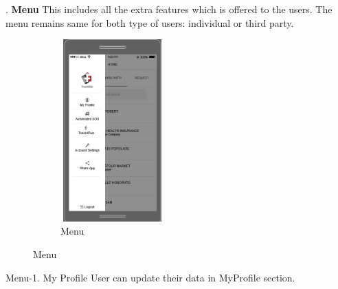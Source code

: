 .
\newline\newline\newline\newline\newline\newline\newline\newline
\textbf{Menu}
\newline
This includes all the extra features which is offered to the users. The menu remains same for both type of users: individual or third party.

\begin{figure}[H]
	\centering
	\begin{subfigure}[b]{0.4\textwidth}	
		\includegraphics[width=4cm,height=7cm]		{./Mockups/6_Menu.JPG}
      	\caption{Menu}
        \label{TrackMe_Menu}
	 \end{subfigure}
\end{figure}

Menu-1. My Profile\newline
User can update their data in MyProfile section.

